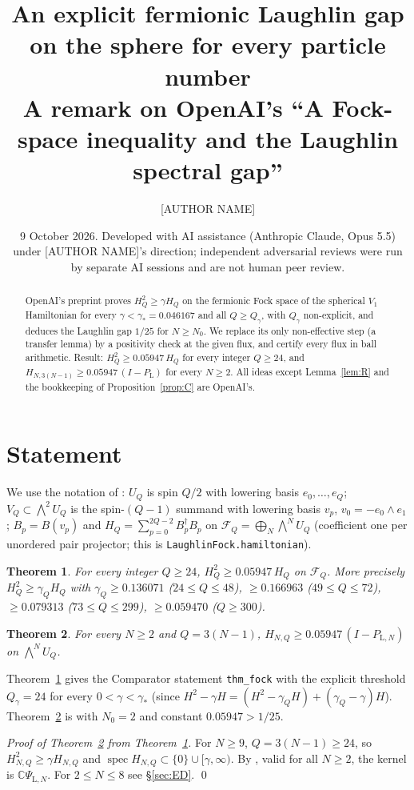 \documentclass[11pt]{amsart}
\title{An explicit fermionic Laughlin gap on the sphere for every particle number\\
\normalsize A remark on OpenAI's ``A Fock-space inequality and the Laughlin spectral gap''}
\author{[AUTHOR NAME]}
\date{9 October 2026. Developed with AI assistance (Anthropic Claude, Opus 5.5) under [AUTHOR NAME]'s direction; independent adversarial reviews were run by separate AI sessions and are not human peer review.}
\newtheorem{theorem}{Theorem}
\theoremstyle{remark}
\newcommand{\FF}{\mathcal F}
\begin{document}
\begin{abstract}
OpenAI's preprint \cite{OAI} proves $H_Q^2\ge\gamma H_Q$ on the fermionic Fock
space of the spherical $V_1$ Hamiltonian for every $\gamma<\gamma_*=0.046167$ and
all $Q\ge Q_\gamma$, with $Q_\gamma$ non-explicit, and deduces the Laughlin gap $1/25$
for $N\ge N_0$. We replace its only non-effective step (a transfer lemma) by a
positivity check at the given flux, and certify every flux in ball arithmetic.
Result: $H_Q^2\ge 0.05947\,H_Q$ for every integer $Q\ge24$, and
$H_{N,3(N-1)}\ge0.05947\,(I-P_{\mathrm L})$ for every $N\ge2$.
All ideas except Lemma~\ref{lem:R} and the bookkeeping of Proposition~\ref{prop:C}
are OpenAI's.
\end{abstract}
\maketitle

\section{Statement}
We use the notation of \cite{OAI}: $U_Q$ is spin $Q/2$ with lowering basis
$e_0,\dots,e_Q$; $V_Q\subset\bigwedge^2U_Q$ is the spin-$(Q-1)$ summand with
lowering basis $v_p$, $v_0=-e_0\wedge e_1$; $B_p=B(v_p)$ and
$H_Q=\sum_{p=0}^{2Q-2}B_p^\dagger B_p$ on $\FF_Q=\bigoplus_N\bigwedge^NU_Q$
(coefficient one per unordered pair projector; this is \texttt{LaughlinFock.hamiltonian}).

\begin{theorem}\label{thm:A}
For every integer $Q\ge24$, $H_Q^2\ge 0.05947\,H_Q$ on $\FF_Q$.
More precisely $H_Q^2\ge\gamma_QH_Q$ with $\gamma_Q\ge0.136071$ ($24\le Q\le48$),
$\ge0.166963$ ($49\le Q\le72$), $\ge0.079313$ ($73\le Q\le299$), $\ge0.059470$ ($Q\ge300$).
\end{theorem}

\begin{theorem}\label{thm:B}
For every $N\ge2$ and $Q=3(N-1)$, $H_{N,Q}\ge 0.05947\,(I-P_{\mathrm L,N})$ on $\bigwedge^NU_Q$.
\end{theorem}

Theorem~\ref{thm:A} gives the Comparator statement \texttt{thm\_fock} with the explicit
threshold $Q_\gamma=24$ for every $0<\gamma<\gamma_*$ (since $H^2-\gamma H=(H^2-\gamma_QH)+(\gamma_Q-\gamma)H$).
Theorem~\ref{thm:B} is \cite[Cor.~1.2]{OAI} with $N_0=2$ and constant $0.05947>1/25$.

\emph{Proof of Theorem~\ref{thm:B} from Theorem~\ref{thm:A}.} For $N\ge9$, $Q=3(N-1)\ge24$,
so $H_{N,Q}^2\ge\gamma H_{N,Q}$ and $\operatorname{spec}H_{N,Q}\subset\{0\}\cup[\gamma,\infty)$.
By \cite[Lemma~6.2]{OAI}, valid for all $N\ge2$, the kernel is $\mathbb C\Psi_{\mathrm L,N}$.
For $2\le N\le8$ see \S\ref{sec:ED}. \qed
\end{document}
